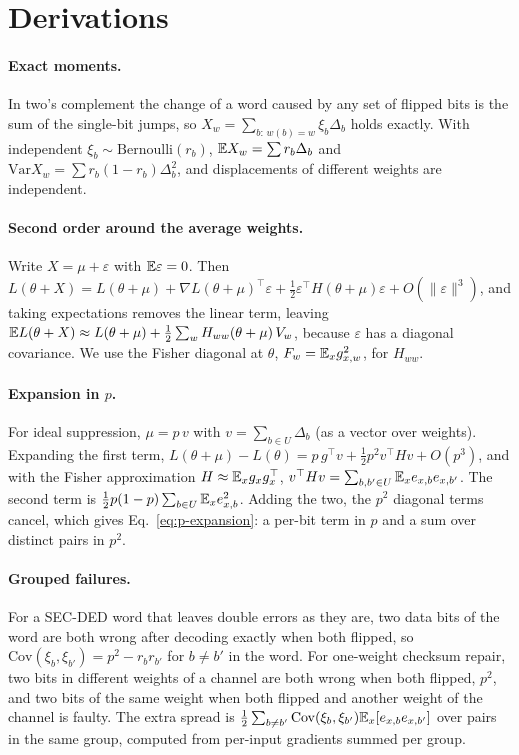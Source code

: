 \appendix
\section{Derivations}\label{app:theory}
\paragraph{Exact moments.} In two's complement the change of a word caused by any set of flipped bits is the sum of the single-bit jumps, so $X_w=\sum_{b:\,w(b)=w}\xi_b\Delta_b$ holds exactly. With independent $\xi_b\sim\mathrm{Bernoulli}(r_b)$, $\mathbb{E} X_w=\sum r_b\Delta_b$ and $\mathrm{Var}X_w=\sum r_b(1-r_b)\Delta_b^2$, and displacements of different weights are independent.

\paragraph{Second order around the average weights.} Write $X=\mu+\varepsilon$ with $\mathbb{E}\varepsilon=0$. Then $L(\theta+X)=L(\theta+\mu)+\nabla L(\theta+\mu)^\top\varepsilon+\tfrac12\varepsilon^\top H(\theta+\mu)\varepsilon+O(\|\varepsilon\|^3)$, and taking expectations removes the linear term, leaving $\mathbb{E} L(\theta+X)\approx L(\theta+\mu)+\tfrac12\sum_w H_{ww}(\theta+\mu)\,V_w$, because $\varepsilon$ has a diagonal covariance. We use the Fisher diagonal at $\theta$, $F_w=\mathbb{E}_x g_{x,w}^2$, for $H_{ww}$.

\paragraph{Expansion in $p$.} For ideal suppression, $\mu=p\,v$ with $v=\sum_{b\in U}\Delta_b$ (as a vector over weights). Expanding the first term, $L(\theta+\mu)-L(\theta)=p\,g^\top v+\tfrac12p^2v^\top Hv+O(p^3)$, and with the Fisher approximation $H\approx\mathbb{E}_x g_xg_x^\top$, $v^\top Hv=\sum_{b,b'\in U}\mathbb{E}_x e_{x,b}e_{x,b'}$. The second term is $\tfrac12p(1-p)\sum_{b\in U}\mathbb{E}_xe_{x,b}^2$. Adding the two, the $p^2$ diagonal terms cancel, which gives Eq.~\eqref{eq:p-expansion}: a per-bit term in $p$ and a sum over distinct pairs in $p^2$.

\paragraph{Grouped failures.} For a SEC-DED word that leaves double errors as they are, two data bits of the word are both wrong after decoding exactly when both flipped, so $\mathrm{Cov}(\xi_b,\xi_{b'})=p^2-r_br_{b'}$ for $b\ne b'$ in the word. For one-weight checksum repair, two bits in different weights of a channel are both wrong when both flipped, $p^2$, and two bits of the same weight when both flipped and another weight of the channel is faulty. The extra spread is $\tfrac12\sum_{b\ne b'}\mathrm{Cov}(\xi_b,\xi_{b'})\mathbb{E}_x[e_{x,b}e_{x,b'}]$ over pairs in the same group, computed from per-input gradients summed per group.


